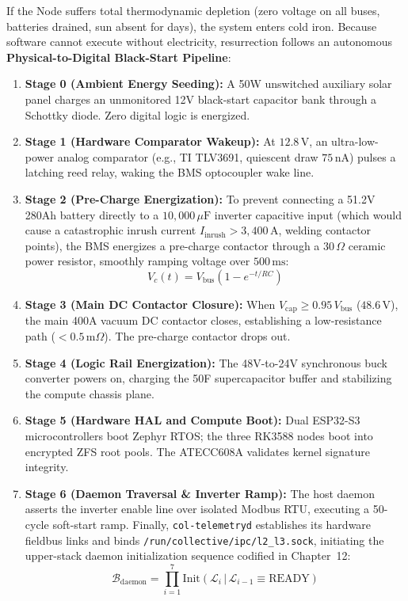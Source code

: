 If the Node suffers total thermodynamic depletion (zero voltage on all buses, batteries drained, sun absent for days), the system enters cold iron. Because software cannot execute without electricity, resurrection follows an autonomous \textbf{Physical-to-Digital Black-Start Pipeline}:
\begin{enumerate}
    \item \textbf{Stage 0 (Ambient Energy Seeding):} A 50W unswitched auxiliary solar panel charges an unmonitored 12V black-start capacitor bank through a Schottky diode. Zero digital logic is energized.
    \item \textbf{Stage 1 (Hardware Comparator Wakeup):} At $12.8\,\mathrm{V}$, an ultra-low-power analog comparator (e.g., TI TLV3691, quiescent draw $75\,\mathrm{nA}$) pulses a latching reed relay, waking the BMS optocoupler wake line.
    \item \textbf{Stage 2 (Pre-Charge Energization):} To prevent connecting a 51.2V 280Ah battery directly to a $10,000\,\mu\mathrm{F}$ inverter capacitive input (which would cause a catastrophic inrush current $I_{\mathrm{inrush}} > 3,400\,\mathrm{A}$, welding contactor points), the BMS energizes a pre-charge contactor through a $30\,\Omega$ ceramic power resistor, smoothly ramping voltage over $500\,\mathrm{ms}$:
    \begin{equation}
    V_c(t) = V_{\mathrm{bus}} \left(1 - e^{-t / RC}\right)
    \end{equation}
    \item \textbf{Stage 3 (Main DC Contactor Closure):} When $V_{\mathrm{cap}} \ge 0.95\,V_{\mathrm{bus}}$ ($48.6\,\mathrm{V}$), the main 400A vacuum DC contactor closes, establishing a low-resistance path ($<0.5\,\mathrm{m}\Omega$). The pre-charge contactor drops out.
    \item \textbf{Stage 4 (Logic Rail Energization):} The 48V-to-24V synchronous buck converter powers on, charging the 50F supercapacitor buffer and stabilizing the compute chassis plane.
    \item \textbf{Stage 5 (Hardware HAL and Compute Boot):} Dual ESP32-S3 microcontrollers boot Zephyr RTOS; the three RK3588 nodes boot into encrypted ZFS root pools. The ATECC608A validates kernel signature integrity.
    \item \textbf{Stage 6 (Daemon Traversal \& Inverter Ramp):} The host daemon asserts the inverter enable line over isolated Modbus RTU, executing a 50-cycle soft-start ramp. Finally, \texttt{col-telemetryd} establishes its hardware fieldbus links and binds \texttt{/run/collective/ipc/l2\_l3.sock}, initiating the upper-stack daemon initialization sequence codified in Chapter~12:
    \begin{equation}
    \mathcal{B}_{\mathrm{daemon}} = \prod_{i=1}^{7} \mathrm{Init}\left(\mathcal{L}_i \,|\, \mathcal{L}_{i-1} \equiv \mathrm{READY}\right)
    \end{equation}
\end{enumerate}

